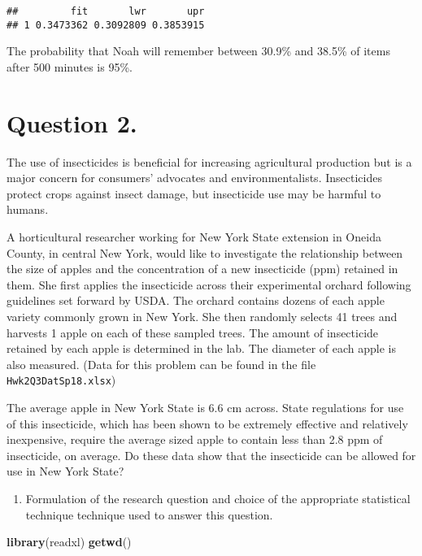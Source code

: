 \documentclass[12pt,]{article}
\newenvironment{Shaded}{\begin{snugshade}}{\end{snugshade}}
\newcommand{\KeywordTok}[1]{\textcolor[rgb]{0.13,0.29,0.53}{\textbf{#1}}}
\newcommand{\NormalTok}[1]{#1}
\providecommand{\tightlist}{%
  \setlength{\itemsep}{0pt}\setlength{\parskip}{0pt}}
\begin{document}
\begin{verbatim}
##         fit       lwr       upr
## 1 0.3473362 0.3092809 0.3853915
\end{verbatim}

The probability that Noah will remember between 30.9\% and 38.5\% of
items after 500 minutes is 95\%. \pagebreak

\section{Question 2.}\label{question-2.}

The use of insecticides is beneficial for increasing agricultural
production but is a major concern for consumers' advocates and
environmentalists. Insecticides protect crops against insect damage, but
insecticide use may be harmful to humans.

A horticultural researcher working for New York State extension in
Oneida County, in central New York, would like to investigate the
relationship between the size of apples and the concentration of a new
insecticide (ppm) retained in them. She first applies the insecticide
across their experimental orchard following guidelines set forward by
USDA. The orchard contains dozens of each apple variety commonly grown
in New York. She then randomly selects 41 trees and harvests 1 apple on
each of these sampled trees. The amount of insecticide retained by each
apple is determined in the lab. The diameter of each apple is also
measured. (Data for this problem can be found in the file
\texttt{Hwk2Q3DatSp18.xlsx})

The average apple in New York State is 6.6 cm across. State regulations
for use of this insecticide, which has been shown to be extremely
effective and relatively inexpensive, require the average sized apple to
contain less than 2.8 ppm of insecticide, on average. Do these data show
that the insecticide can be allowed for use in New York State?

\begin{enumerate}
\def\labelenumi{\alph{enumi})}
\tightlist
\item
  Formulation of the research question and choice of the appropriate
  statistical technique technique used to answer this question.
\end{enumerate}

\begin{Shaded}
\begin{Highlighting}[]
\KeywordTok{library}\NormalTok{(readxl)}
\KeywordTok{getwd}\NormalTok{()}
\end{Highlighting}
\end{Shaded}
\end{document}
